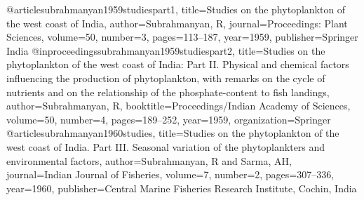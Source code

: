 @article{subrahmanyan1959studiespart1,
	title={Studies on the phytoplankton of the west coast of India},
	author={Subrahmanyan, R},
	journal={Proceedings: Plant Sciences},
	volume={50},
	number={3},
	pages={113--187},
	year={1959},
	publisher={Springer India}
}
@inproceedings{subrahmanyan1959studiespart2,
	title={Studies on the phytoplankton of the west coast of India: Part II. Physical and chemical factors influencing the production of phytoplankton, with remarks on the cycle of nutrients and on the relationship of the phosphate-content to fish landings},
	author={Subrahmanyan, R},
	booktitle={Proceedings/Indian Academy of Sciences},
	volume={50},
	number={4},
	pages={189--252},
	year={1959},
	organization={Springer}
}
@article{subrahmanyan1960studies,
	title={Studies on the phytoplankton of the west coast of India. Part III. Seasonal variation of the phytoplankters and environmental factors},
	author={Subrahmanyan, R and Sarma, AH},
	journal={Indian Journal of Fisheries},
	volume={7},
	number={2},
	pages={307--336},
	year={1960},
	publisher={Central Marine Fisheries Research Institute, Cochin, India}
}

